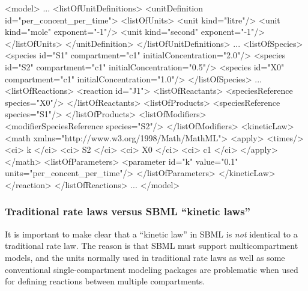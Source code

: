 \begin{example}

<model>
    ...
    <listOfUnitDefinitions>
        <unitDefinition id="per_concent_per_time">
            <listOfUnits>
                <unit kind="litre"/>
                <unit kind="mole"   exponent="-1"/>
                <unit kind="second" exponent="-1"/>
            </listOfUnits>
        </unitDefinition>
    </listOfUnitDefinitions>
    ...
    <listOfSpecies>
        <species id="S1" compartment="c1" initialConcentration="2.0"/>
        <species id="S2" compartment="c1" initialConcentration="0.5"/>
        <species id="X0" compartment="c1" initialConcentration="1.0"/>
    </listOfSpecies>
    ...
    <listOfReactions>
        <reaction id="J1">
            <listOfReactants>
                <speciesReference species="X0"/>
            </listOfReactants>
            <listOfProducts>
                <speciesReference species="S1"/>
            </listOfProducts>
            <listOfModifiers>
                <modifierSpeciesReference species="S2"/>
            </listOfModifiers>
            <kineticLaw>
                <math xmlns="http://www.w3.org/1998/Math/MathML">
                    <apply>
                        <times/> <ci> k </ci> <ci> S2 </ci> <ci> X0 </ci> <ci> c1 </ci>
                    </apply>
                </math>
                <listOfParameters>
                    <parameter id="k" value="0.1" units="per_concent_per_time"/>
                </listOfParameters>
            </kineticLaw>
        </reaction>
    </listOfReactions>
    ...
</model>
\end{example}



\subsubsection{Traditional rate laws versus SBML ``kinetic laws''}
\label{sec:about-kinetic-laws}


It is important to make clear that a ``kinetic law'' in SBML is
\emph{not} identical to a traditional rate law.  The reason is
that SBML must support multicompartment models, and the units
normally used in traditional rate laws as well as some conventional
single-compartment modeling packages are problematic when used for
defining reactions between multiple compartments.

